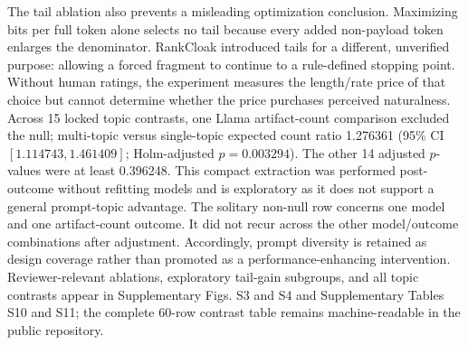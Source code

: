 \documentclass[fleqn,10pt]{wlscirep}
\begin{document}
The tail ablation also prevents a misleading optimization conclusion. Maximizing bits per full token alone selects no tail because every added non-payload token enlarges the denominator. RankCloak introduced tails for a different, unverified purpose: allowing a forced fragment to continue to a rule-defined stopping point. Without human ratings, the experiment measures the length/rate price of that choice but cannot determine whether the price purchases perceived naturalness.
Across 15 locked topic contrasts, one Llama artifact-count comparison excluded the null; multi-topic versus single-topic expected count ratio 1.276361 (95\% CI \([1.114743, 1.461409]\); Holm-adjusted \(p=0.003294\)). The other 14 adjusted \(p\)-values were at least 0.396248. This compact extraction was performed post-outcome without refitting models and is exploratory as it does not support a general prompt-topic advantage.
The solitary non-null row concerns one model and one artifact-count outcome. It did not recur across the other model/outcome combinations after adjustment. Accordingly, prompt diversity is retained as design coverage rather than promoted as a performance-enhancing intervention. Reviewer-relevant ablations, exploratory tail-gain subgroups, and all topic contrasts appear in Supplementary Figs. S3 and S4 and Supplementary Tables S10 and S11; the complete 60-row contrast table remains machine-readable in the public repository.
\end{document}
